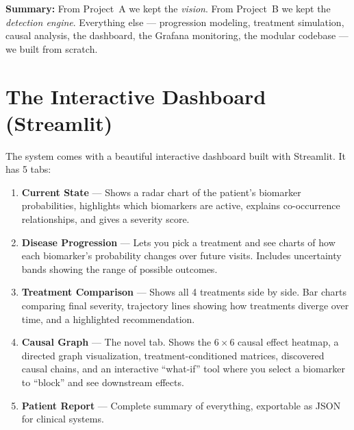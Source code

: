 \documentclass[12pt,a4paper]{article}
\begin{document}
\begin{mdframed}[style=keypoint]
\textbf{Summary:} From Project~A we kept the \emph{vision}. From Project~B we kept the \emph{detection engine}. Everything else --- progression modeling, treatment simulation, causal analysis, the dashboard, the Grafana monitoring, the modular codebase --- we built from scratch.
\end{mdframed}


\section{The Interactive Dashboard (Streamlit)}

The system comes with a beautiful interactive dashboard built with Streamlit. It has 5 tabs:

\begin{enumerate}
  \item \textbf{Current State} --- Shows a radar chart of the patient's biomarker probabilities, highlights which biomarkers are active, explains co-occurrence relationships, and gives a severity score.

  \item \textbf{Disease Progression} --- Lets you pick a treatment and see charts of how each biomarker's probability changes over future visits. Includes uncertainty bands showing the range of possible outcomes.

  \item \textbf{Treatment Comparison} --- Shows all 4 treatments side by side. Bar charts comparing final severity, trajectory lines showing how treatments diverge over time, and a highlighted recommendation.

  \item \textbf{Causal Graph} --- The novel tab. Shows the $6 \times 6$ causal effect heatmap, a directed graph visualization, treatment-conditioned matrices, discovered causal chains, and an interactive ``what-if'' tool where you select a biomarker to ``block'' and see downstream effects.

  \item \textbf{Patient Report} --- Complete summary of everything, exportable as JSON for clinical systems.
\end{enumerate}


\end{document}
